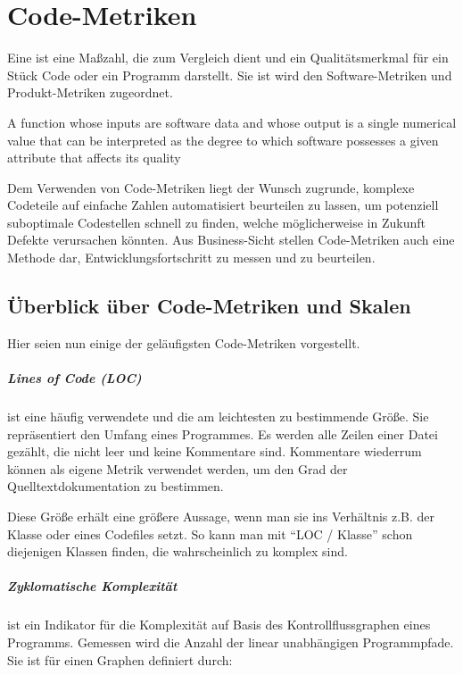 \chapter{Code-Metriken}
\label{sec:metriken}
Eine  ist eine Maßzahl, die zum Vergleich dient und ein Qualitätsmerkmal für ein Stück Code oder ein Programm darstellt. Sie ist wird den Software-Metriken und Produkt-Metriken zugeordnet.

\epigraph{A function whose inputs are software data and whose output is a single
numerical value that can be interpreted as the degree to which software possesses a given attribute that affects its quality}{\citep{ieee_1998}}

Dem Verwenden von Code-Metriken liegt der Wunsch zugrunde, komplexe Codeteile auf einfache Zahlen automatisiert beurteilen zu lassen, um potenziell suboptimale Codestellen schnell zu finden, welche möglicherweise in Zukunft Defekte verursachen könnten. Aus Business-Sicht stellen Code-Metriken auch eine Methode dar, Entwicklungsfortschritt zu messen und zu beurteilen.
\section{Überblick über Code-Metriken und Skalen}
Hier seien nun einige der geläufigsten Code-Metriken vorgestellt.
\paragraph{Lines of Code (LOC)} ist eine häufig verwendete und die am leichtesten zu bestimmende Größe. Sie repräsentiert den Umfang eines Programmes. Es werden alle Zeilen einer Datei gezählt, die nicht leer und keine Kommentare sind. Kommentare wiederrum können als eigene Metrik verwendet werden, um den Grad der Quelltextdokumentation zu bestimmen.

Diese Größe erhält eine größere Aussage, wenn man sie ins Verhältnis z.B. der Klasse oder eines Codefiles setzt. So kann man mit "`LOC / Klasse"' schon diejenigen Klassen finden, die wahrscheinlich zu komplex sind. \\

\paragraph{Zyklomatische Komplexität} ist ein Indikator für die Komplexität auf Basis des Kontrollflussgraphen eines Programms. Gemessen wird die Anzahl der linear unabhängigen Programmpfade. Sie ist für einen Graphen definiert durch:

